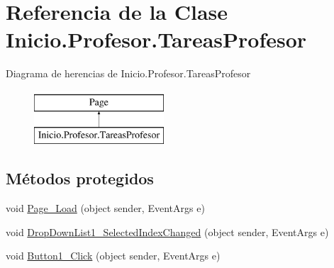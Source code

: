 \hypertarget{classInicio_1_1Profesor_1_1TareasProfesor}{}\section{Referencia de la Clase Inicio.\+Profesor.\+Tareas\+Profesor}
\label{classInicio_1_1Profesor_1_1TareasProfesor}
Diagrama de herencias de Inicio.\+Profesor.\+Tareas\+Profesor\begin{figure}[H]
\begin{center}
\leavevmode
\includegraphics[height=2.000000cm]{classInicio_1_1Profesor_1_1TareasProfesor}
\end{center}
\end{figure}
\subsection*{Métodos protegidos}
\begin{DoxyCompactItemize}
\item 
void \mbox{\hyperlink{classInicio_1_1Profesor_1_1TareasProfesor_a74d7a919e1c7b78045937de1a091114a}{Page\+\_\+\+Load}} (object sender, Event\+Args e)
\item 
void \mbox{\hyperlink{classInicio_1_1Profesor_1_1TareasProfesor_a6a7213bc8dd68806a50d7e866ceab0ca}{Drop\+Down\+List1\+\_\+\+Selected\+Index\+Changed}} (object sender, Event\+Args e)
\item 
void \mbox{\hyperlink{classInicio_1_1Profesor_1_1TareasProfesor_affa9b2812d5b263c4fedcaec2685d736}{Button1\+\_\+\+Click}} (object sender, Event\+Args e)
\end{DoxyCompactItemize}
